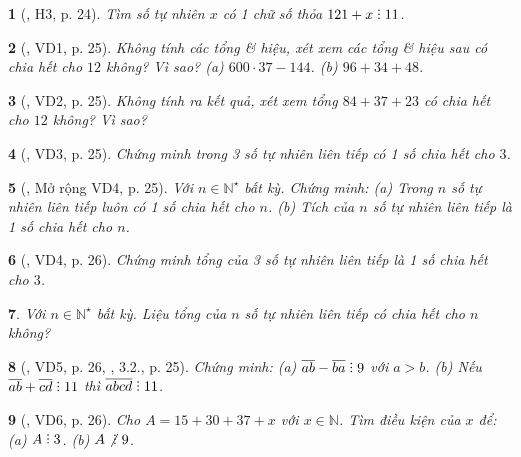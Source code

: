 \documentclass{article}
\newtheorem{baitoan}{}
\DeclareRobustCommand{\divby}{%
	\mathrel{\vbox{\baselineskip.65ex\lineskiplimit0pt\hbox{.}\hbox{.}\hbox{.}}}%
}
\begin{document}
\begin{baitoan}[\cite{Binh_boi_duong_Toan_6_tap_1}, H3, p. 24]
	Tìm số tự nhiên $x$ có 1 chữ số thỏa $121 + x\divby11$.
\end{baitoan}

\begin{baitoan}[\cite{Binh_boi_duong_Toan_6_tap_1}, VD1, p. 25]
	Không tính các tổng \& hiệu, xét xem các tổng \& hiệu sau có chia hết cho $12$ không? Vì sao? (a) $600\cdot37 - 144$. (b) $96 + 34 + 48$.
\end{baitoan}

\begin{baitoan}[\cite{Binh_boi_duong_Toan_6_tap_1}, VD2, p. 25]
	Không tính ra kết quả, xét xem tổng $84 + 37 + 23$ có chia hết cho $12$ không? Vì sao?
\end{baitoan}

\begin{baitoan}[\cite{Binh_boi_duong_Toan_6_tap_1}, VD3, p. 25]
	Chứng minh trong 3 số tự nhiên liên tiếp có 1 số chia hết cho $3$.
\end{baitoan}

\begin{baitoan}[\cite{Binh_boi_duong_Toan_6_tap_1}, Mở rộng VD4, p. 25]
	Với $n\in\mathbb{N}^\star$ bất kỳ. Chứng minh: (a) Trong $n$ số tự nhiên liên tiếp luôn có 1 số chia hết cho $n$. (b) Tích của $n$ số tự nhiên liên tiếp là 1 số chia hết cho $n$.
\end{baitoan}

\begin{baitoan}[\cite{Binh_boi_duong_Toan_6_tap_1}, VD4, p. 26]
	Chứng minh tổng của 3 số tự nhiên liên tiếp là 1 số chia hết cho $3$.
\end{baitoan}

\begin{baitoan}
	Với $n\in\mathbb{N}^\star$ bất kỳ. Liệu tổng của $n$ số tự nhiên liên tiếp có chia hết cho $n$ không?
\end{baitoan}

\begin{baitoan}[\cite{Binh_boi_duong_Toan_6_tap_1}, VD5, p. 26, \cite{TLCT_THCS_Toan_6_so_hoc}, 3.2., p. 25]
	Chứng minh: (a) $\overline{ab} - \overline{ba}\divby9$ với $a > b$. (b) Nếu $\overline{ab} + \overline{cd}\divby11$ thì $\overline{abcd}\divby11$.
\end{baitoan}

\begin{baitoan}[\cite{Binh_boi_duong_Toan_6_tap_1}, VD6, p. 26]
	Cho $A = 15 + 30 + 37 + x$ với $x\in\mathbb{N}$. Tìm điều kiện của $x$ để: (a) $A\divby3$. (b) $A\not{\divby}\ 9$.
\end{baitoan}
\end{document}

